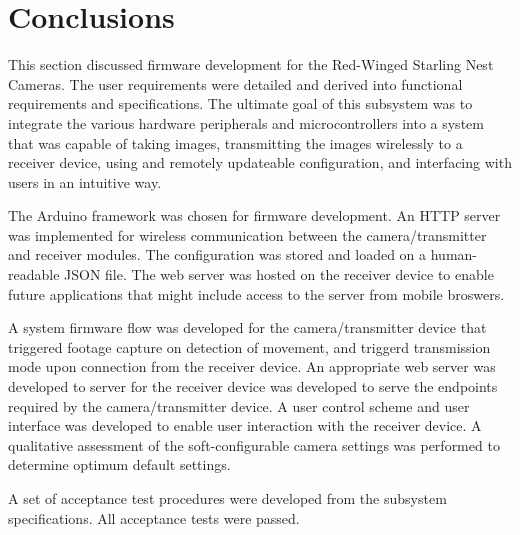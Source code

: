 \documentclass[class=report,11pt,crop=false]{standalone}
\begin{document}


\section{Conclusions}

This section discussed firmware development for the Red-Winged Starling Nest Cameras. The user requirements were detailed and derived into functional requirements and specifications. The ultimate goal of this subsystem was to integrate the various hardware peripherals and microcontrollers into a system that was capable of taking images, transmitting the images wirelessly to a receiver device, using and remotely updateable configuration, and interfacing with users in an intuitive way. 

The Arduino framework was chosen for firmware development. An HTTP server was implemented for wireless communication between the camera/transmitter and receiver modules. The configuration was stored and loaded on a human-readable JSON file. The web server was hosted on the receiver device to enable future applications that might include access to the server from mobile broswers.

A system firmware flow was developed for the camera/transmitter device that triggered footage capture on detection of movement, and triggerd transmission mode upon connection from the receiver device. An appropriate web server was developed to server for the receiver device was developed to serve the endpoints required by the camera/transmitter device. A user control scheme and user interface was developed to enable user interaction with the receiver device. A qualitative assessment of the soft-configurable camera settings was performed to determine optimum default settings.

A set of acceptance test procedures were developed from the subsystem specifications. All acceptance tests were passed.


\ifstandalone

\printnoidxglossary[type=\acronymtype,nonumberlist]
\fi
\end{document}
